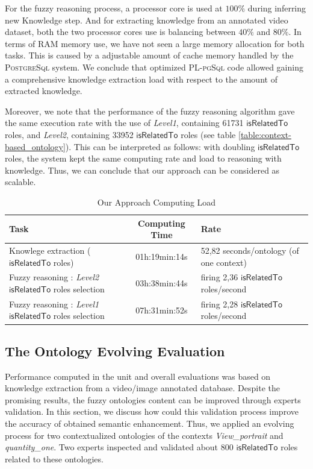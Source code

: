 		For the fuzzy reasoning process, a processor core is used at
		$100\%{}$ during inferring new Knowledge step. 
		And for extracting knowledge from an annotated video dataset, 
		both the two processor cores use is balancing between $40\%{}$ and $80\%{}$.
		In terms of RAM memory use, we have not seen a large memory 
		allocation for both tasks. 
		This is caused by a adjustable amount of cache memory  
		handled by the \textsc{PostgreSql} system. We conclude that optimized 
		\textsc{PL-pgSql} code allowed gaining a comprehensive knowledge extraction
		load with respect to the amount of extracted knowledge.
		
		Moreover, we note that the performance of the fuzzy 
		reasoning algorithm gave the same execution rate with the use of 
		\emph{Level1}, containing 61731 $\mathsf{isRelatedTo}$ roles, and 
		\emph{Level2}, containing 33952 $\mathsf{isRelatedTo}$ roles (see table
		{\ref{table:context-based_ontology}}). This can be interpreted as follows:
		with doubling $\mathsf{isRelatedTo}$ roles, the system kept the same computing
		rate and load to reasoning with knowledge. 
		Thus, we can conclude that our approach can be considered as scalable.
		
		\begin{table}
			\centering	
			\caption{Our Approach Computing Load}
			\label{table_scalabilite}
			\begin{tabular}{p{4.5cm}|c|p{4cm}}
			\textbf{\textsf{Task}} & \textbf{\textsf{Computing Time}} &
			\textbf{\textsf{Rate}}
			\\
			\hline
   			Knowlege extraction ($\mathsf{isRelatedTo}$ roles)  &
   						01h:19min:14s & 
   						52,82 seconds/ontology (of one context)\\\hline\hline
   			Fuzzy reasoning : \emph{Level2} $\mathsf{isRelatedTo}$ roles selection
   			   			&  	03h:38min:44s      &
   			   			firing 2,36 $\mathsf{isRelatedTo}$ roles/second \\\hline
   			Fuzzy reasoning : \emph{Level1} $\mathsf{isRelatedTo}$ roles selection &
   						07h:31min:52s      &
   						firing 2,28 $\mathsf{isRelatedTo}$
   						roles/second \\\hline
    		\end{tabular}
		\end{table}
		
		

		\subsection{The Ontology Evolving Evaluation}
		Performance computed in the unit and overall evaluations was based on knowledge extraction 
		from a video/image annotated database. 
		Despite the promising results, the fuzzy ontologies content can 
		be improved through experts validation. 
		In this section, we discuss how could this validation process improve 
		the accuracy of obtained semantic enhancement. 
		Thus, we applied an evolving process for two contextualized ontologies of the contexts 
		\emph{View\_portrait} and \emph{quantity\_one}. 
		Two experts inspected and validated about 800 $\mathsf{isRelatedTo}$ roles related to these ontologies. 

